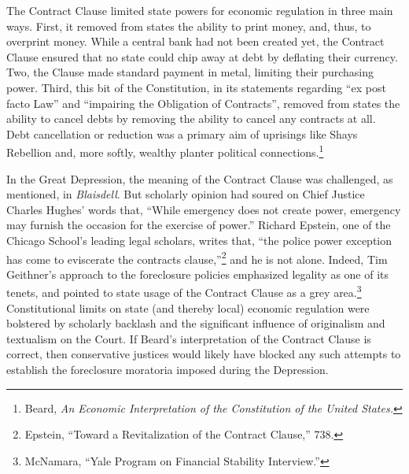 \documentclass[
]{article}
\let\rmarkdownfootnote\footnote%
\def\footnote{\protect\rmarkdownfootnote}
\begin{document}
The Contract Clause limited state powers for economic regulation in
three main ways. First, it removed from states the ability to print
money, and, thus, to overprint money. While a central bank had not been
created yet, the Contract Clause ensured that no state could chip away
at debt by deflating their currency. Two, the Clause made standard
payment in metal, limiting their purchasing power. Third, this bit of
the Constitution, in its statements regarding ``ex post facto Law'' and
``impairing the Obligation of Contracts'', removed from states the
ability to cancel debts by removing the ability to cancel any contracts
at all. Debt cancellation or reduction was a primary aim of uprisings
like Shays Rebellion and, more softly, wealthy planter political
connections.\footnote{Beard, \emph{An Economic Interpretation of the
  Constitution of the United States.}}

In the Great Depression, the meaning of the Contract Clause was
challenged, as mentioned, in \emph{Blaisdell}. But scholarly opinion had
soured on Chief Justice Charles Hughes' words that, ``While emergency
does not create power, emergency may furnish the occasion for the
exercise of power.'' Richard Epstein, one of the Chicago School's
leading legal scholars, writes that, ``the police power exception has
come to eviscerate the contracts clause,''\footnote{Epstein, ``Toward a
  Revitalization of the Contract Clause,'' 738.} and he is not alone.
Indeed, Tim Geithner's approach to the foreclosure policies emphasized
legality as one of its tenets, and pointed to state usage of the
Contract Clause as a grey area.\footnote{McNamara, ``Yale Program on
  Financial Stability Interview.''} Constitutional limits on state (and
thereby local) economic regulation were bolstered by scholarly backlash
and the significant influence of originalism and textualism on the
Court. If Beard's interpretation of the Contract Clause is correct, then
conservative justices would likely have blocked any such attempts to
establish the foreclosure moratoria imposed during the Depression.
\end{document}
